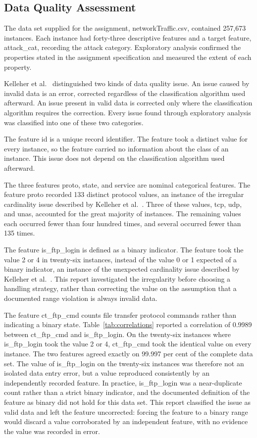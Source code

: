\documentclass[10pt,conference]{IEEEtran}
\begin{document}
\subsection{Data Quality Assessment}
\label{sec:methodology-dq}

The data set supplied for the assignment, networkTraffic.csv, contained 257,673 instances. Each instance had forty-three descriptive features and a target feature, attack\_cat, recording the attack category. Exploratory analysis confirmed the properties stated in the assignment specification and measured the extent of each property.

Kelleher et al.~\cite{kelleher2020} distinguished two kinds of data quality issue. An issue caused by invalid data is an error, corrected regardless of the classification algorithm used afterward. An issue present in valid data is corrected only where the classification algorithm requires the correction. Every issue found through exploratory analysis was classified into one of these two categories.

The feature id is a unique record identifier. The feature took a distinct value for every instance, so the feature carried no information about the class of an instance. This issue does not depend on the classification algorithm used afterward.

The three features proto, state, and service are nominal categorical features. The feature proto recorded 133 distinct protocol values, an instance of the irregular cardinality issue described by Kelleher et al.~\cite{kelleher2020}. Three of these values, tcp, udp, and unas, accounted for the great majority of instances. The remaining values each occurred fewer than four hundred times, and several occurred fewer than 135 times.

The feature is\_ftp\_login is defined as a binary indicator. The feature took the value 2 or 4 in twenty-six instances, instead of the value 0 or 1 expected of a binary indicator, an instance of the unexpected cardinality issue described by Kelleher et al.~\cite{kelleher2020}. This report investigated the irregularity before choosing a handling strategy, rather than correcting the value on the assumption that a documented range violation is always invalid data.

The feature ct\_ftp\_cmd counts file transfer protocol commands rather than indicating a binary state. Table~\ref{tab:correlations} reported a correlation of 0.9989 between ct\_ftp\_cmd and is\_ftp\_login. On the twenty-six instances where is\_ftp\_login took the value 2 or 4, ct\_ftp\_cmd took the identical value on every instance. The two features agreed exactly on 99.997 per cent of the complete data set. The value of is\_ftp\_login on the twenty-six instances was therefore not an isolated data entry error, but a value reproduced consistently by an independently recorded feature. In practice, is\_ftp\_login was a near-duplicate count rather than a strict binary indicator, and the documented definition of the feature as binary did not hold for this data set. This report classified the issue as valid data and left the feature uncorrected: forcing the feature to a binary range would discard a value corroborated by an independent feature, with no evidence the value was recorded in error.
\end{document}
